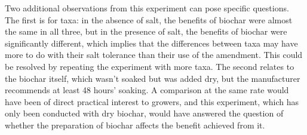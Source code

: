 Two additional observations from this experiment can pose specific questions. The first is for taxa: in the absence of salt, the benefits of biochar were almost the same in all three, but in the presence of salt, the benefits of biochar were significantly different, which implies that the differences between taxa may have more to do with their salt tolerance than their use of the amendment. This could be resolved by repeating the experiment with more taxa. The second relates to the biochar itself, which wasn't soaked but was added dry, but the manufacturer recommends at least 48 hours' soaking. A comparison at the same rate would have been of direct practical interest to growers, and this experiment, which has only been conducted with dry biochar, would have answered the question of whether the preparation of biochar affects the benefit achieved from it.
